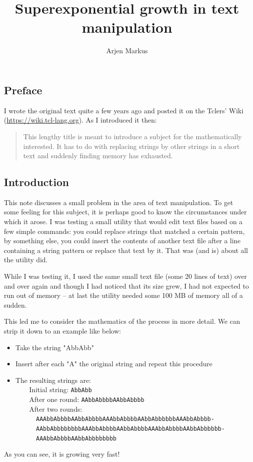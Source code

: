 \documentclass[onecolumn]{article}
\begin{document}
\title{Superexponential growth in text manipulation}
\author{Arjen Markus}

\maketitle

\subsection*{Preface}
I wrote the original text quite a few years ago and posted it on the Tclers' Wiki (\url{https://wiki.tcl-lang.org}). As I introduced it then:
\begin{quote}
This lengthy title is meant to introduce a subject for the mathematically interested.
It has to do with replacing strings by other strings in a short text and suddenly finding memory has exhausted.
\end{quote}

\subsection*{Introduction}

This note discusses a small problem in the area of text manipulation. To get some feeling for this subject,
it is perhaps good to know the circumstances under which it arose. I was testing a small utility that would
edit text files based on a few simple commands: you could replace strings that matched a certain pattern,
by something else, you could insert the contents of another text file after a line containing a string
pattern or replace that text by it. That was (and is) about all the utility did.

While I was testing it, I used the same small text file (some 20 lines of text) over and over again and
though I had noticed that its size grew, I had not expected to run out of memory -- at last the utility
needed some 100 MB of memory all of a sudden.

This led me to consider the mathematics of the process in more detail.
We can strip it down to an example like below:
\begin{itemize}
\item
Take the string "AbbAbb"
\item
Insert after each "A" the original string and repeat this procedure
\item
The resulting strings are: \\
~~~~Initial string: \verb+AbbAbb+ \\
~~~~After one round: \verb+AAbbAbbbbAAbbAbbbb+ \\
~~~~After two rounds: \\
~~~~~~\verb+AAAbbAbbbbAAbbAbbbbAAAbbAbbbbAAbbAbbbbbbAAAbbAbbbb-+ \\
~~~~~~\verb+AAbbAbbbbbbbbAAAbbAbbbbAAbbAbbbbAAAbbAbbbbAAbbAbbbbbb-+ \\
~~~~~~\verb+AAAbbAbbbbAAbbAbbbbbbbb+
\end{itemize}
As you can see, it is growing very fast!
\end{document}
